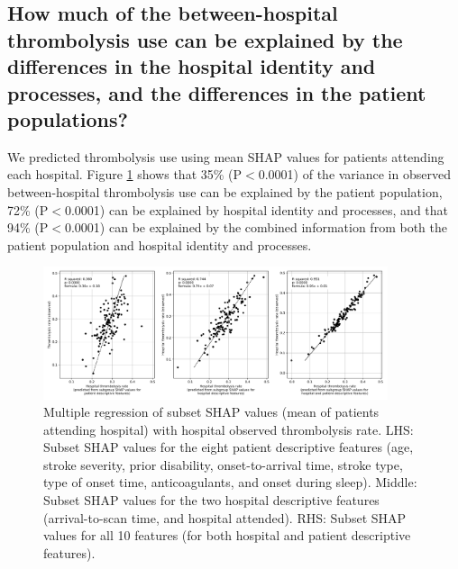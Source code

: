 \subsection{How much of the between-hospital thrombolysis use can be explained by the differences in the hospital identity and processes, and the differences in the patient populations?}%

We predicted thrombolysis use using mean SHAP values for patients attending each hospital. Figure \ref{fig:shap_multiple_regression} shows that 35\% (P$<$0.0001) of the variance in observed between-hospital thrombolysis use can be explained by the patient population, 72\% (P$<$0.0001) can be explained by hospital identity and processes, and that 94\% (P$<$0.0001) can be explained by the combined information from both the patient population and hospital identity and processes. 


\begin{figure}[!h]
    \centering
    \includegraphics[width=0.9\textwidth]{./images/03e_xgb_10_features_multiple_regression_patient_hosptial}
    \caption{Multiple regression of subset SHAP values (mean of patients attending hospital) with hospital observed thrombolysis rate. LHS: Subset SHAP values for the eight patient descriptive features (age, stroke severity, prior disability, onset-to-arrival time, stroke type, type of onset time, anticoagulants, and onset during sleep). Middle: Subset SHAP values for the two hospital descriptive features (arrival-to-scan time, and hospital attended). RHS: Subset SHAP values for all 10 features (for both hospital and patient descriptive features).}
  \label{fig:shap_multiple_regression}
\end{figure}


